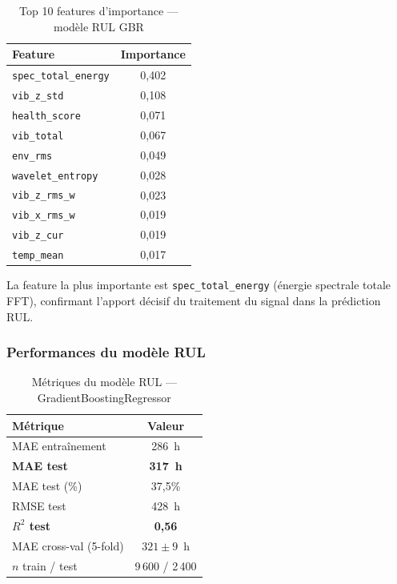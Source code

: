\documentclass[12pt,a4paper]{report}
\begin{document}
\begin{table}[h]
\centering
\caption{Top 10 features d'importance — modèle RUL GBR}
\begin{tabular}{lc}
\toprule
\textbf{Feature} & \textbf{Importance} \\
\midrule
\texttt{spec\_total\_energy}     & 0,402 \\
\texttt{vib\_z\_std}             & 0,108 \\
\texttt{health\_score}           & 0,071 \\
\texttt{vib\_total}              & 0,067 \\
\texttt{env\_rms}                & 0,049 \\
\texttt{wavelet\_entropy}        & 0,028 \\
\texttt{vib\_z\_rms\_w}          & 0,023 \\
\texttt{vib\_x\_rms\_w}          & 0,019 \\
\texttt{vib\_z\_cur}             & 0,019 \\
\texttt{temp\_mean}              & 0,017 \\
\bottomrule
\end{tabular}
\end{table}

\noindent La feature la plus importante est \texttt{spec\_total\_energy} (énergie spectrale totale FFT),
confirmant l'apport décisif du traitement du signal dans la prédiction RUL.

\subsubsection{Performances du modèle RUL}

\begin{table}[h]
\centering
\caption{Métriques du modèle RUL — GradientBoostingRegressor}
\begin{tabular}{lc}
\toprule
\textbf{Métrique} & \textbf{Valeur} \\
\midrule
MAE entraînement     & 286~h \\
\textbf{MAE test}    & \textbf{317~h} \\
MAE test (\%)        & 37,5\% \\
RMSE test            & 428~h \\
\textbf{$R^2$ test}  & \textbf{0,56} \\
MAE cross-val (5-fold) & $321 \pm 9$~h \\
$n$ train / test     & 9\,600 / 2\,400 \\
\bottomrule
\end{tabular}
\end{table}
\end{document}
